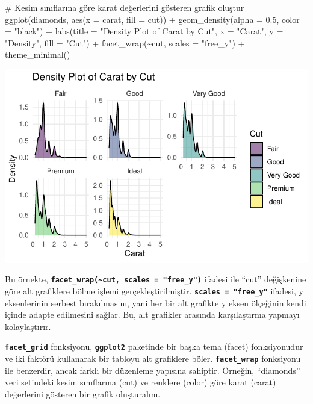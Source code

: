 \documentclass[
  letterpaper,
  DIV=11,
  numbers=noendperiod]{scrreprt}
\newenvironment{Shaded}{\begin{snugshade}}{\end{snugshade}}
\newcommand{\AttributeTok}[1]{\textcolor[rgb]{0.40,0.45,0.13}{#1}}
\newcommand{\CommentTok}[1]{\textcolor[rgb]{0.37,0.37,0.37}{#1}}
\newcommand{\FloatTok}[1]{\textcolor[rgb]{0.68,0.00,0.00}{#1}}
\newcommand{\FunctionTok}[1]{\textcolor[rgb]{0.28,0.35,0.67}{#1}}
\newcommand{\NormalTok}[1]{\textcolor[rgb]{0.00,0.23,0.31}{#1}}
\newcommand{\SpecialCharTok}[1]{\textcolor[rgb]{0.37,0.37,0.37}{#1}}
\newcommand{\StringTok}[1]{\textcolor[rgb]{0.13,0.47,0.30}{#1}}
\begin{document}
\begin{Shaded}
\begin{Highlighting}[]
\CommentTok{\# Kesim sınıflarına göre karat değerlerini gösteren grafik oluştur}
\FunctionTok{ggplot}\NormalTok{(diamonds, }\FunctionTok{aes}\NormalTok{(}\AttributeTok{x =}\NormalTok{ carat, }\AttributeTok{fill =}\NormalTok{ cut)) }\SpecialCharTok{+}
  \FunctionTok{geom\_density}\NormalTok{(}\AttributeTok{alpha =} \FloatTok{0.5}\NormalTok{, }\AttributeTok{color =} \StringTok{"black"}\NormalTok{) }\SpecialCharTok{+}
  \FunctionTok{labs}\NormalTok{(}\AttributeTok{title =} \StringTok{"Density Plot of Carat by Cut"}\NormalTok{,}
       \AttributeTok{x =} \StringTok{"Carat"}\NormalTok{,}
       \AttributeTok{y =} \StringTok{"Density"}\NormalTok{,}
       \AttributeTok{fill =} \StringTok{"Cut"}\NormalTok{) }\SpecialCharTok{+}
  \FunctionTok{facet\_wrap}\NormalTok{(}\SpecialCharTok{\textasciitilde{}}\NormalTok{cut, }\AttributeTok{scales =} \StringTok{"free\_y"}\NormalTok{) }\SpecialCharTok{+}
  \FunctionTok{theme\_minimal}\NormalTok{()}
\end{Highlighting}
\end{Shaded}

\includegraphics{ggplot2_files/figure-pdf/unnamed-chunk-5-1.pdf}

Bu örnekte,
\textbf{\texttt{facet\_wrap(\textasciitilde{}cut,\ scales\ =\ "free\_y")}}
ifadesi ile ``cut'' değişkenine göre alt grafiklere bölme işlemi
gerçekleştirilmiştir. \textbf{\texttt{scales\ =\ "free\_y"}} ifadesi, y
eksenlerinin serbest bırakılmasını, yani her bir alt grafikte y eksen
ölçeğinin kendi içinde adapte edilmesini sağlar. Bu, alt grafikler
arasında karşılaştırma yapmayı kolaylaştırır.

\textbf{\texttt{facet\_grid}} fonksiyonu, \textbf{\texttt{ggplot2}}
paketinde bir başka tema (facet) fonksiyonudur ve iki faktörü kullanarak
bir tabloyu alt grafiklere böler. \textbf{\texttt{facet\_wrap}}
fonksiyonu ile benzerdir, ancak farklı bir düzenleme yapısına sahiptir.
Örneğin, ``diamonds'' veri setindeki kesim sınıflarına (cut) ve renklere
(color) göre karat (carat) değerlerini gösteren bir grafik oluşturalım.
\end{document}
